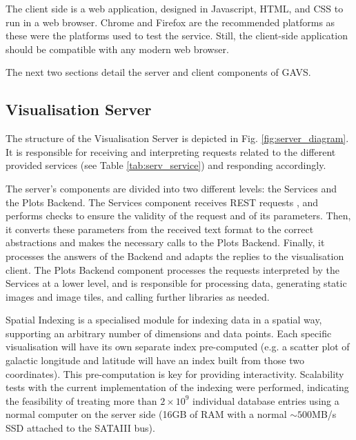 \documentclass[longauth, final]{aa}
\begin{document}
The client side is a web application, designed in Javascript, HTML, and CSS to run in a web browser. Chrome and Firefox are the recommended platforms as these were the platforms used to test the service. Still, the client-side application should be compatible with any modern web browser.

The next two sections detail the server and client components of GAVS.

\subsection{Visualisation Server}
\label{sec:server}


The structure of the Visualisation Server is depicted in Fig. \ref{fig:server_diagram}. It is responsible for receiving and interpreting requests related to the different provided services (see Table \ref{tab:serv_service}) and responding accordingly. 

The  server's components are divided into two different levels: the Services and the Plots Backend. The Services component receives REST requests \citep{Fielding:2000}, and performs checks to ensure the validity of the request and of its parameters. Then, it converts these parameters from the received text format to the correct abstractions and makes the necessary calls to the Plots Backend. Finally, it processes the answers of the Backend and adapts the replies to the visualisation client. The Plots Backend component processes the requests interpreted by the Services at a lower level, and is  responsible for processing data, generating static images and image tiles, and calling further libraries as needed.

Spatial Indexing is a specialised module for indexing data in a spatial way, supporting an arbitrary number of dimensions and  data points. Each specific visualisation will have its own separate index pre-computed (e.g. a scatter plot of galactic longitude and latitude will have an index built from those two coordinates). This pre-computation is key for providing interactivity. Scalability tests with the current implementation of the indexing were performed, indicating the feasibility of treating more than $2\times10^9$ individual database entries using a normal computer on the server side (16GB of RAM with a normal $\sim500$MB/s SSD attached to the SATAIII bus).
\end{document}
